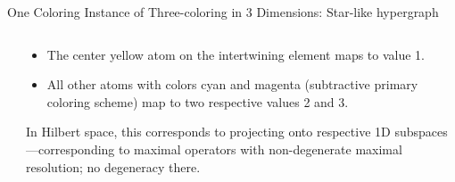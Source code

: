 \documentclass{beamer}
\begin{document}
\begin{frame}{One Coloring Instance of Three-coloring in 3 Dimensions: Star-like hypergraph}
\begin{columns}[c]
\begin{column}{0.45\textwidth}
{
            }
        \end{column}
        \begin{column}{0.55\textwidth}
            \begin{itemize}[<+->] %
                \item The center \alert{\color{yellow}yellow} atom on the intertwining element maps to value 1.
                \item All other atoms with colors \alert{\color{cyan}cyan} and \alert{\color{magenta}magenta} (subtractive primary coloring scheme) map to two respective values 2 and 3.
            \end{itemize}
            In Hilbert space, this corresponds to projecting onto respective 1D subspaces---corresponding to maximal operators with non-degenerate maximal resolution; no degeneracy there.
        \end{column}
    \end{columns}
\end{frame}
\end{document}
